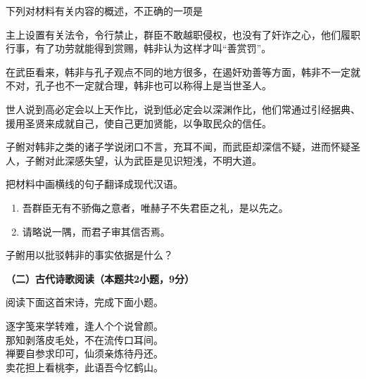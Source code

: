 \documentclass{exam-zh}
\begin{document}
\begin{question}[points=3]
    下列对材料有关内容的概述，不正确的一项是\paren

    \begin{choices}
        \item 主上设置有关法令，令行禁止，群臣不敢越职侵权，也没有了奸诈之心，他们履职行事，有了功劳就能得到赏赐，韩非认为这样才叫“善赏罚”。
        \item 在武臣看来，韩非与孔子观点不同的地方很多，在遏奸劝善等方面，韩非不一定就不对，孔子也不一定就合理，韩非也可以称得上是当世圣人。
        \item 世人说到高必定会以上天作比，说到低必定会以深渊作比，他们常通过引经据典、援用圣贤来成就自己，使自己更加贤能，以争取民众的信任。
        \item 子鲋对韩非之类的诸子学说闭口不言，充耳不闻，而武臣却深信不疑，进而怀疑圣人，子鲋对此深感失望，认为武臣是见识短浅，不明大道。
    \end{choices}
\end{question}

\begin{question}[points=8]
    把材料中画横线的句子翻译成现代汉语。
    
    \begin{enumerate}[label=(\arabic*)]
        \item 吾群臣无有不骄侮之意者，唯赫子不失君臣之礼，是以先之。
        \item 请略说一隅，而君子审其信否焉。
    \end{enumerate}
\end{question}

\begin{question}[points=3]
    子鲋用以批驳韩非的事实依据是什么？
\end{question}

{\bfseries（二）古代诗歌阅读（本题共2小题，9分）}

阅读下面这首宋诗，完成下面小题。
\begin{poem}[author=林希逸,title=答友人论学]
    逐字笺来学转难，逢人个个说曾颜。\\
    那知剥落皮毛处，不在流传口耳间。\\
    禅要自参求印可，仙须亲炼待丹还。\\
    卖花担上看桃李，此语吾今忆鹤山。
\end{poem}
\end{document}
